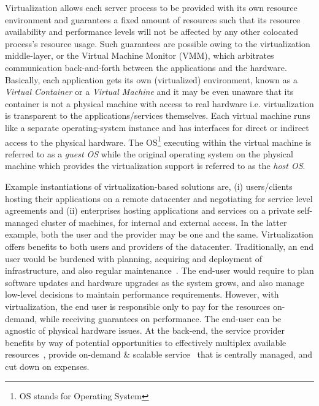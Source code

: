 Virtualization allows each server process to be provided with its own
resource environment and guarantees a fixed amount of resources such that
its resource availability and performance levels will not be affected by
any other colocated process's resource usage.
Such guarantees are possible owing to the
virtualization middle-layer, or the 
Virtual Machine Monitor (VMM), which
arbitrates communication back-and-forth between the applications and the
hardware. Basically, each application gets
its own (virtualized) environment, 
known as a \textit{Virtual Container} or a
\textit{Virtual Machine} and it may be even unaware that 
its container is not a
physical machine with access to real hardware i.e. virtualization is
transparent to the applications/services themselves. Each virtual machine
runs like a separate operating-system instance and has interfaces for
direct or indirect access to the physical hardware. The OS\footnote{OS stands
for Operating System} executing within the virtual machine is referred to
as a \textit{guest OS} while the original 
operating system on the physical
machine which provides the virtualization support is referred to as
the \textit{host OS}.

Example instantiations of
virtualization-based solutions are, (i) users/clients hosting their
applications on a remote datacenter 
and negotiating for service level agreements
and (ii) enterprises hosting applications and services on a
private self-managed cluster of machines, for internal and external
access.
In the latter
example, both the user and the provider may be one and the same.
Virtualization offers benefits to both users and providers 
of the datacenter.
Traditionally, an end user would be burdened with planning, acquiring
and deployment of infrastructure, 
and also regular maintenance~\cite{berkeley-view}. The end-user
would require to plan software updates and hardware upgrades as the system
grows, and also manage low-level decisions to maintain performance
requirements. However, with virtualization, the end user is responsible only
to pay for the resources on-demand, while receiving guarantees on performance.
The end-user can be agnostic of physical hardware issues. At the back-end,
the service provider benefits by way of potential opportunities to
effectively multiplex available resources~\cite{vm-multiplexing}, 
provide on-demand \& scalable service~\cite{google-live-migration} 
that is centrally managed, and cut down on expenses.


